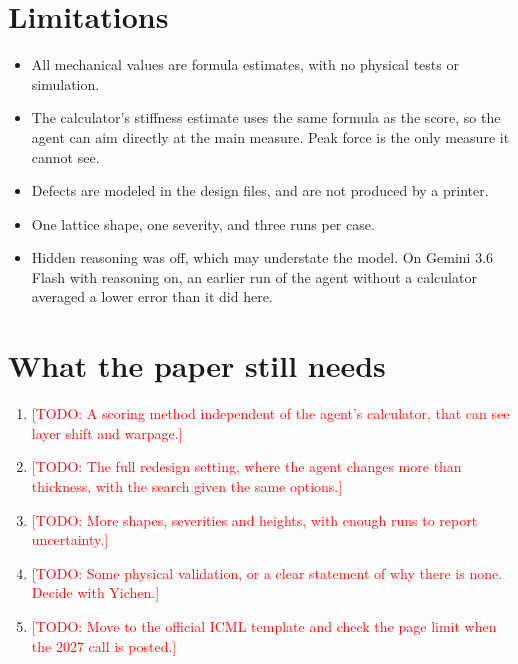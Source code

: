 \documentclass[11pt]{article}
\newcommand{\todo}[1]{\textcolor{red}{[TODO: #1]}}
\begin{document}
\section{Limitations}
\begin{itemize}
  \item All mechanical values are formula estimates, with no physical tests or simulation.
  \item The calculator's stiffness estimate uses the same formula as the score, so the agent can aim directly at the main measure. Peak force is the only measure it cannot see.
  \item Defects are modeled in the design files, and are not produced by a printer.
  \item One lattice shape, one severity, and three runs per case.
  \item Hidden reasoning was off, which may understate the model. On Gemini 3.6 Flash with reasoning on, an earlier run of the agent without a calculator averaged a lower error than it did here.
\end{itemize}

\section{What the paper still needs}
\begin{enumerate}
  \item \todo{A scoring method independent of the agent's calculator, that can see layer shift and warpage.}
  \item \todo{The full redesign setting, where the agent changes more than thickness, with the search given the same options.}
  \item \todo{More shapes, severities and heights, with enough runs to report uncertainty.}
  \item \todo{Some physical validation, or a clear statement of why there is none. Decide with Yichen.}
  \item \todo{Move to the official ICML template and check the page limit when the 2027 call is posted.}
\end{enumerate}



\end{document}
